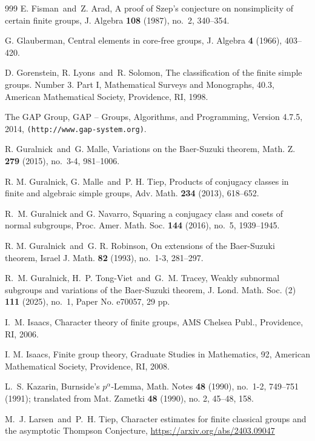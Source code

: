\documentclass[twoside,a4paper,reqno,12pt]{amsart}
\newcommand{\<}{\langle}
\renewcommand{\>}{\rangle}
\renewcommand{\:}{\colon}
\theoremstyle{definition}
\begin{document}
\begin{thebibliography}{999}
 E. Fisman\ and\ Z. Arad, A proof of Szep's conjecture on nonsimplicity of certain finite groups, {J. Algebra} {\bf 108} (1987), no.~2, 340--354. 

 G. Glauberman, Central elements in core-free groups, {J. Algebra} \textbf{4} (1966), 403--420.

 D. Gorenstein, R. Lyons\ and\ R. Solomon, {The classification of the finite simple groups. Number 3. Part I}, Mathematical Surveys and Monographs, 40.3, American Mathematical Society, Providence, RI, 1998. 

 The GAP Group, {GAP -- Groups, Algorithms, and Programming, Version 4.7.5}, 2014, \texttt{(http://www.gap-system.org)}.


 R. Guralnick\ and\ G. Malle, Variations on the Baer-Suzuki theorem, {Math. Z.} \textbf{ 279} (2015), no.~3-4, 981--1006. 


 R. M. Guralnick, G. Malle\ and\ P. H. Tiep, Products of conjugacy classes in finite and algebraic simple groups, {Adv. Math.} {\bf 234} (2013), 618--652.

 R.~M. Guralnick and G. Navarro, Squaring a conjugacy class and cosets of normal subgroups, {Proc. Amer. Math. Soc.} {\bf 144} (2016), no.~5, 1939--1945.


 R. M. Guralnick\ and\ G. R. Robinson, On extensions of the Baer-Suzuki theorem, {Israel J. Math.} \textbf{ 82} (1993), no.~1-3, 281--297. 


  R.~M. Guralnick, H.~P. Tong-Viet\ and\ G.~M. Tracey, Weakly subnormal subgroups and variations of the Baer-Suzuki theorem, J. Lond. Math. Soc. (2) {\bf 111} (2025), no.~1, Paper No. e70057, 29 pp.

 I.~M. Isaacs, {Character theory of finite groups},  AMS Chelsea Publ., Providence, RI, 2006.


 I. M. Isaacs, {Finite group theory}, Graduate Studies in Mathematics, 92, American Mathematical Society, Providence, RI, 2008.

 L.~S. Kazarin,  Burnside's $p^\alpha$-Lemma, {Math. Notes} {\bf 48} (1990), no.~1-2, 749--751 (1991); translated from {Mat. Zametki} {\bf 48} (1990), no. 2, 45--48, 158. 


  M.~J. Larsen\ and\ P.~H. Tiep, Character estimates for finite classical groups and the asymptotic Thompson Conjecture, \url{https://arxiv.org/abs/2403.09047}


\end{thebibliography}
\end{document}
